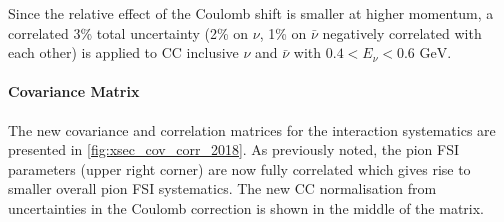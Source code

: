 Since the relative effect of the Coulomb shift is smaller at higher momentum, a correlated 3\% total uncertainty (2\% on $\nu$, 1\% on $\bar{\nu}$ negatively correlated with each other) is applied to CC inclusive $\nu$ and $\bar{\nu}$ with $0.4 < E_\nu < 0.6 \text{ GeV}$.

\paragraph{Covariance Matrix}
The new covariance and correlation matrices for the interaction systematics are presented in \autoref{fig:xsec_cov_corr_2018}. As previously noted, the pion FSI parameters (upper right corner) are now fully correlated which gives rise to smaller overall pion FSI systematics. The new CC normalisation from uncertainties in the Coulomb correction is shown in the middle of the matrix.
